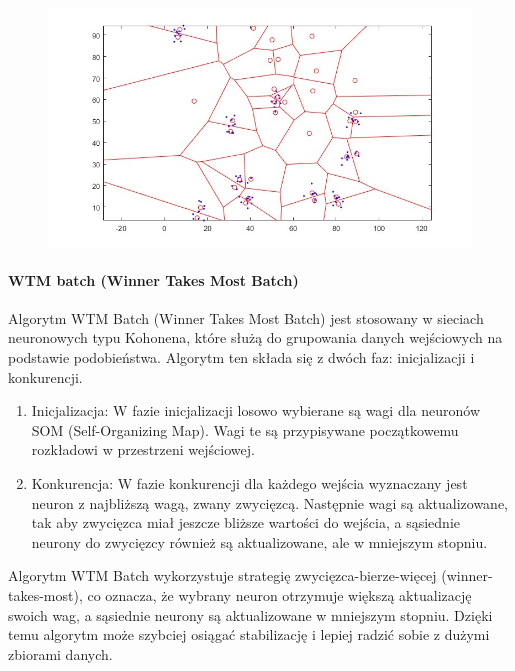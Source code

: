 \documentclass[11pt]{article}
\begin{document}
\begin{figure}[h!]
  \includegraphics{screeny/CWTA/CWTA_10_groups/CWTA_Areas.jpg}
\end{figure}

\hypertarget{wtm-batch-winner-takes-most-batch}{%
\paragraph{WTM batch (Winner Takes Most
Batch)}\label{wtm-batch-winner-takes-most-batch}}

Algorytm WTM Batch (Winner Takes Most Batch) jest stosowany w sieciach
neuronowych typu Kohonena, które służą do grupowania danych wejściowych
na podstawie podobieństwa. Algorytm ten składa się z dwóch faz:
inicjalizacji i konkurencji.

\begin{enumerate}
\def\labelenumi{\arabic{enumi}.}
\item
  Inicjalizacja: W fazie inicjalizacji losowo wybierane są wagi dla
  neuronów SOM (Self-Organizing Map). Wagi te są przypisywane
  początkowemu rozkładowi w przestrzeni wejściowej.
\item
  Konkurencja: W fazie konkurencji dla każdego wejścia wyznaczany jest
  neuron z najbliższą wagą, zwany zwycięzcą. Następnie wagi są
  aktualizowane, tak aby zwycięzca miał jeszcze bliższe wartości do
  wejścia, a sąsiednie neurony do zwycięzcy również są aktualizowane,
  ale w mniejszym stopniu.
\end{enumerate}

Algorytm WTM Batch wykorzystuje strategię zwycięzca-bierze-więcej
(winner-takes-most), co oznacza, że wybrany neuron otrzymuje większą
aktualizację swoich wag, a sąsiednie neurony są aktualizowane w
mniejszym stopniu. Dzięki temu algorytm może szybciej osiągać
stabilizację i lepiej radzić sobie z dużymi zbiorami danych.
\end{document}
